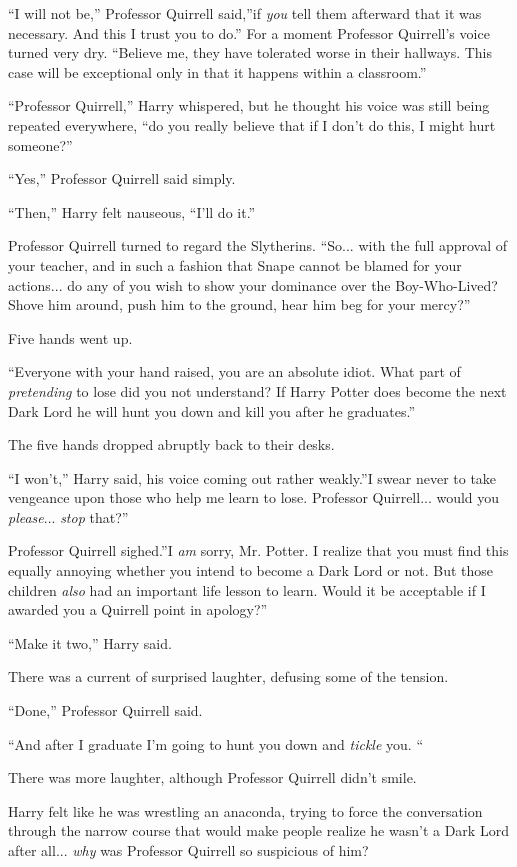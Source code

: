 ``I will not be,'' Professor Quirrell said,''if \emph{you} tell them
afterward that it was necessary. And this I trust you to do.'' For a
moment Professor Quirrell's voice turned very dry. ``Believe me, they
have tolerated worse in their hallways. This case will be exceptional
only in that it happens within a classroom.''

``Professor Quirrell,'' Harry whispered, but he thought his voice was
still being repeated everywhere, ``do you really believe that if I don't
do this, I might hurt someone?''

``Yes,'' Professor Quirrell said simply.

``Then,'' Harry felt nauseous, ``I'll do it.''

Professor Quirrell turned to regard the Slytherins. ``So... with
the full approval of your teacher, and in such a fashion that Snape
cannot be blamed for your actions... do any of you wish to show
your dominance over the Boy-Who-Lived? Shove him around, push him to the
ground, hear him beg for your mercy?''

Five hands went up.

``Everyone with your hand raised, you are an absolute idiot. What part of
\emph{pretending} to lose did you not understand? If Harry Potter does
become the next Dark Lord he will hunt you down and kill you after he
graduates.''

The five hands dropped abruptly back to their desks.

``I won't,'' Harry said, his voice coming out rather weakly.''I swear
never to take vengeance upon those who help me learn to lose. Professor
Quirrell... would you \emph{please}... \emph{stop} that?''

Professor Quirrell sighed.''I \emph{am} sorry, Mr. Potter. I realize
that you must find this equally annoying whether you intend to become a
Dark Lord or not. But those children \emph{also} had an important life
lesson to learn. Would it be acceptable if I awarded you a Quirrell
point in apology?''

``Make it two,'' Harry said.

There was a current of surprised laughter, defusing some of the tension.

``Done,'' Professor Quirrell said.

``And after I graduate I'm going to hunt you down and \emph{tickle} you.
``

There was more laughter, although Professor Quirrell didn't smile.

Harry felt like he was wrestling an anaconda, trying to force the
conversation through the narrow course that would make people realize he
wasn't a Dark Lord after all... \emph{why} was Professor Quirrell
so suspicious of him?

